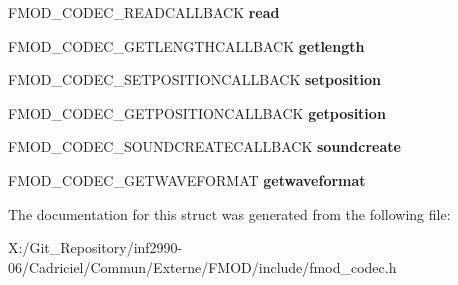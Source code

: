 \begin{DoxyCompactItemize}
\item 
\hypertarget{struct_f_m_o_d___c_o_d_e_c___d_e_s_c_r_i_p_t_i_o_n_ac64375412d9cd6e73fdf0d9aea0ca37a}{F\-M\-O\-D\-\_\-\-C\-O\-D\-E\-C\-\_\-\-R\-E\-A\-D\-C\-A\-L\-L\-B\-A\-C\-K {\bfseries read}}\label{struct_f_m_o_d___c_o_d_e_c___d_e_s_c_r_i_p_t_i_o_n_ac64375412d9cd6e73fdf0d9aea0ca37a}

\item 
\hypertarget{struct_f_m_o_d___c_o_d_e_c___d_e_s_c_r_i_p_t_i_o_n_a83a086b8d6537aa0c7c271fc2adb4fbf}{F\-M\-O\-D\-\_\-\-C\-O\-D\-E\-C\-\_\-\-G\-E\-T\-L\-E\-N\-G\-T\-H\-C\-A\-L\-L\-B\-A\-C\-K {\bfseries getlength}}\label{struct_f_m_o_d___c_o_d_e_c___d_e_s_c_r_i_p_t_i_o_n_a83a086b8d6537aa0c7c271fc2adb4fbf}

\item 
\hypertarget{struct_f_m_o_d___c_o_d_e_c___d_e_s_c_r_i_p_t_i_o_n_a7d60d107fe48efef977f2a883fd097be}{F\-M\-O\-D\-\_\-\-C\-O\-D\-E\-C\-\_\-\-S\-E\-T\-P\-O\-S\-I\-T\-I\-O\-N\-C\-A\-L\-L\-B\-A\-C\-K {\bfseries setposition}}\label{struct_f_m_o_d___c_o_d_e_c___d_e_s_c_r_i_p_t_i_o_n_a7d60d107fe48efef977f2a883fd097be}

\item 
\hypertarget{struct_f_m_o_d___c_o_d_e_c___d_e_s_c_r_i_p_t_i_o_n_a3e532db698aa1f571ddb4afb20f53682}{F\-M\-O\-D\-\_\-\-C\-O\-D\-E\-C\-\_\-\-G\-E\-T\-P\-O\-S\-I\-T\-I\-O\-N\-C\-A\-L\-L\-B\-A\-C\-K {\bfseries getposition}}\label{struct_f_m_o_d___c_o_d_e_c___d_e_s_c_r_i_p_t_i_o_n_a3e532db698aa1f571ddb4afb20f53682}

\item 
\hypertarget{struct_f_m_o_d___c_o_d_e_c___d_e_s_c_r_i_p_t_i_o_n_a9004a5424a76ae31edc173015a20233e}{F\-M\-O\-D\-\_\-\-C\-O\-D\-E\-C\-\_\-\-S\-O\-U\-N\-D\-C\-R\-E\-A\-T\-E\-C\-A\-L\-L\-B\-A\-C\-K {\bfseries soundcreate}}\label{struct_f_m_o_d___c_o_d_e_c___d_e_s_c_r_i_p_t_i_o_n_a9004a5424a76ae31edc173015a20233e}

\item 
\hypertarget{struct_f_m_o_d___c_o_d_e_c___d_e_s_c_r_i_p_t_i_o_n_a81c4079df89138532f9c435ebd0d1f64}{F\-M\-O\-D\-\_\-\-C\-O\-D\-E\-C\-\_\-\-G\-E\-T\-W\-A\-V\-E\-F\-O\-R\-M\-A\-T {\bfseries getwaveformat}}\label{struct_f_m_o_d___c_o_d_e_c___d_e_s_c_r_i_p_t_i_o_n_a81c4079df89138532f9c435ebd0d1f64}

\end{DoxyCompactItemize}


The documentation for this struct was generated from the following file\-:\begin{DoxyCompactItemize}
\item 
X\-:/\-Git\-\_\-\-Repository/inf2990-\/06/\-Cadriciel/\-Commun/\-Externe/\-F\-M\-O\-D/include/fmod\-\_\-codec.\-h\end{DoxyCompactItemize}
